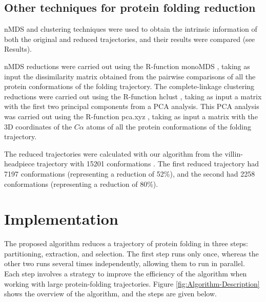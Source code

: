 \documentclass[twocolumn]{bmcart}%
\begin{document}
\subsection*{Other techniques for protein folding reduction \label{subsec:Techniques-for-reduction}}

nMDS and clustering techniques were used to obtain the intrinsic information of both the original and reduced trajectories, and their results were compared (see Results).

nMDS reductions were carried out using the R-function monoMDS \cite{Oksanen2019}, taking as input the dissimilarity matrix obtained from the pairwise comparisons of all the protein conformations of the folding trajectory. The complete-linkage clustering reductions were carried out using the R-function hclust \cite{RCoreTeam2018}, taking as input a matrix with the first two principal components from a PCA analysis. This PCA analysis was carried out using the R-function pca.xyz \cite{Grant2006}, taking as input a matrix with the 3D coordinates of the $C\alpha$ atoms of all the protein conformations of the folding trajectory.

The reduced trajectories were calculated with our algorithm from the villin-headpiece trajectory with 15201 conformations \cite{Larson2009}. The first reduced trajectory had 7197 conformations (representing a reduction of 52\%), and the second had 2258 conformations (representing a reduction of 80\%).


\section*{Implementation}

The proposed algorithm reduces a trajectory of protein folding in three steps: partitioning, extraction, and selection. The first step runs only once, whereas the other two runs several times independently, allowing them to run in parallel. Each step involves a strategy to improve the efficiency of the algorithm when working with large protein-folding trajectories. Figure \ref{fig:Algorithm-Description} shows the overview of the algorithm, and the steps are given below.

%
%
\end{document}
